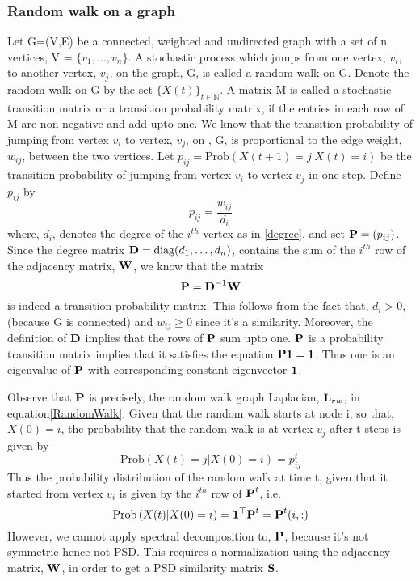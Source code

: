 \subsubsection{Random walk on a graph}
Let G=(V,E) be a connected, weighted and undirected graph with a set of n vertices, V = $\{v_{1}, \dots, v_{n} \}$.
A stochastic process which jumps from one vertex, $v_{i}$, to another vertex, $v_{j}$, on the graph, G, is called a random walk on G.
Denote the random walk on G by the set $\{X(t)\}_{t \in \mathbb{N}}$.
A matrix M is called a stochastic transition matrix or a transition probability
matrix, if the entries in each row of M are non-negative and add upto one.
We know that the transition probability of jumping from vertex $v_{i}$
to vertex, $v_{j}$, on , G, is proportional to the edge weight, $w_{ij}$, between the two vertices. 
Let $p_{ij} = \text{Prob} \left(X(t+1) = j | X(t) = i \right)$ be the transition probability of jumping from vertex $v_{i}$ to vertex $v_{j}$ in one step. Define $p_{ij}$ by
\begin{equation}
p_{ij}   = \frac{w_{ij}}{d_{i}}
\end{equation}
where, $d_{i}$,  denotes the degree of the $i^{th}$ vertex as in \eqref{degree}, and 
set $\textbf{P} = (p_{ij})$. Since the degree matrix $\textbf{D} = \text{diag}(d_{1}, \ldots, d_{n})$, contains the sum of the $i^{th}$ row of the adjacency matrix, $\textbf{W}$,
we know that the matrix 
\begin{equation}\label{transitmatrix}
\textbf{P} = \textbf{D}^{-1}\textbf{W} 
\end{equation}
is indeed a transition probability matrix. This follows from the fact that, $d_{i} > 0$, (because G is connected) and $w_{ij} \geq 0$ since it's a similarity. Moreover, the definition of $\textbf{D}$ implies that the rows of $\textbf{P}$ sum upto one. 
$\textbf{P}$ is a probability transition matrix implies that it satisfies
the equation $\textbf{P} \boldsymbol{1} = \boldsymbol{1}$. Thus one is an eigenvalue of 
$\textbf{P}$ with corresponding constant eigenvector $\boldsymbol{1}$.

Observe that $\textbf{P}$ is precisely, the random walk graph Laplacian, $\textbf{L}_{rw}$, in equation\eqref{RandomWalk}.
Given that the random walk starts at node i, so that, $X(0) = i$, the probability
that the random walk is at vertex $v_{j}$ after t steps is given by
\[
\text{Prob}\left( X(t) = j | X(0) = i  \right) = p_{ij}^{t}
\]
Thus the probability distribution of the random walk at time t, given that it started from vertex $v_{i}$ is given by the  $i^{th}$ row of $\textbf{P}^{t}$, i.e.
\[
\text{Prob}\left( X(t) | X(0) = i  \right) = \boldsymbol{1}^{\top}\textbf{P}^{t} = \textbf{P}^{t}(i, :)
\]
However, we cannot apply spectral decomposition to, $\textbf{P}$, because it's
not symmetric hence not PSD.
This requires a normalization using the adjacency matrix, $\textbf{W}$, in order
to get a PSD similarity matrix $\textbf{S}$.

